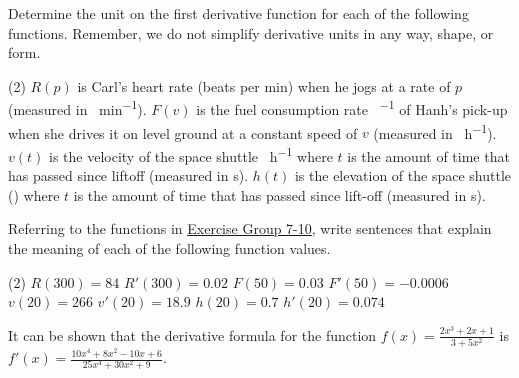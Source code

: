 \documentclass[12pt,]{book}
\theoremstyle{plain}
\theoremstyle{definition}
\numberwithin{equation}{section}
\newcommand{\fe}[2]{#1\mathopen{}\left(#2\right)\mathclose{}}
\newcommand{\fd}[1]{#1'}
\begin{document}
\par\smallskip\noindent
\hypertarget{exercisegroup-derivative-units-supplement}{\null}Determine the unit on the first derivative function for each of the following functions.  Remember, we do not simplify derivative units in any way, shape, or form.%
\par
\begin{exercisegroup}(2)
\exercise[7.]\hypertarget{exercise-derivative-units-supplement-first}{\null}\(\fe{R}{p}\) is Carl's heart rate (beats per min) when he jogs at a rate of \(p\) (measured in \si{\foot\per\minute}).%
\exercise[8.]\hypertarget{exercise-208}{\null}\(\fe{F}{v}\) is the fuel consumption rate \si{\gallon\per\mile} of Hanh's pick-up when she drives it on level ground at a constant speed of \(v\) (measured in \si{\mile\per\hour}).%
\exercise[9.]\hypertarget{exercise-209}{\null}\(\fe{v}{t}\) is the velocity of the space shuttle  \si{\mile\per\hour} where \(t\) is the amount of time that has passed since liftoff (measured in \si{\second}).%
\exercise[10.]\hypertarget{exercise-derivative-units-supplement-last}{\null}\(\fe{h}{t}\) is the elevation of the space shuttle (\si{\mile}) where \(t\) is the amount of time that has passed since lift-off (measured in \si{\second}).%
\end{exercisegroup}
\par\smallskip\noindent
\hypertarget{exercisegroup-43}{\null}Referring to the functions in \hyperlink{exercisegroup-derivative-units-supplement}{Exercise Group 7-10}, write sentences that explain the meaning of each of the following function values.%
\par
\begin{exercisegroup}(2)
\exercise[11.]\hypertarget{exercise-211}{\null}\(\fe{R}{300}=84\)%
\exercise[12.]\hypertarget{exercise-212}{\null}\(\fe{\fd{R}}{300}=0.02\)%
\exercise[13.]\hypertarget{exercise-213}{\null}\(\fe{F}{50}=0.03\)%
\exercise[14.]\hypertarget{exercise-214}{\null}\(\fe{\fd{F}}{50}=-0.0006\)%
\exercise[15.]\hypertarget{exercise-215}{\null}\(\fe{v}{20}=266\)%
\exercise[16.]\hypertarget{exercise-216}{\null}\(\fe{\fd{v}}{20}=18.9\)%
\exercise[17.]\hypertarget{exercise-217}{\null}\(\fe{h}{20}=0.7\)%
\exercise[18.]\hypertarget{exercise-218}{\null}\(\fe{\fd{h}}{20}=0.074\)%
\end{exercisegroup}
\par\smallskip\noindent
\hypertarget{exercisegroup-44}{\null}It can be shown that the derivative formula for the function \(\fe{f}{x}=\frac{2x^3+2x+1}{3+5x^2}\) is \(\fe{\fd{f}}{x}=\frac{10x^4+8x^2-10x+6}{25x^4+30x^2+9}\).%
\end{document}
